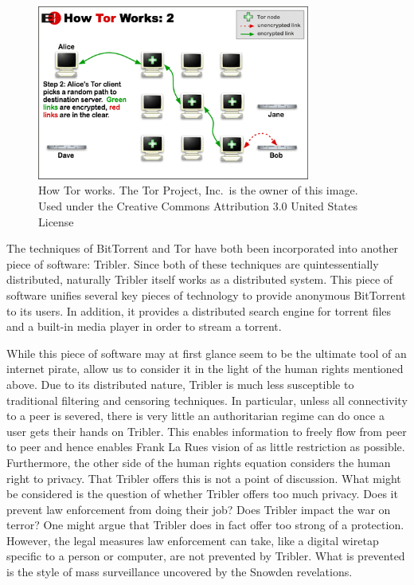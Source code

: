 \documentclass[a4paper,11pt]{book}
\theoremstyle{definition}
\begin{document}
\begin{figure}[ht]
    \centering
    \includegraphics[width=0.8\textwidth]{plots_all/htw2}
    \caption{How Tor works. The Tor Project, Inc.\protect\footnotemark~is the owner of this image. 
    Used under the Creative Commons Attribution 3.0 United States License\protect\footnotemark }
    \label{fig:htw2}

\end{figure}

The techniques of BitTorrent and Tor have both been incorporated into another piece
of software: Tribler. Since both of these techniques are quintessentially distributed,
naturally Tribler itself works as a distributed system. This piece of software unifies
several key pieces of technology to provide anonymous BitTorrent to its users. In addition,
it provides a distributed search engine for torrent files and a built-in media player in
order to stream a torrent. 

While this piece of software may at first glance seem to be the ultimate tool of an internet pirate, 
allow us to consider it in the light of the human rights mentioned above. Due to its
distributed nature, Tribler is much less susceptible to traditional filtering and
censoring techniques. In particular, unless all connectivity to a peer is severed,
there is very little an authoritarian regime can do once a user gets their hands
on Tribler. This enables information to freely flow from peer to peer and hence 
enables Frank La Rues vision of as little restriction as possible. 
Furthermore, the other side of the human rights equation considers the human
right to privacy. That Tribler offers this is not a point of discussion. What might
be considered is the question of whether Tribler offers too much privacy. Does it
prevent law enforcement from doing their job? Does Tribler impact the war on terror?
One might argue that Tribler does in fact offer too strong of a protection.
However, the legal measures law enforcement can take, like a digital
wiretap specific to a person or computer, are not prevented by Tribler. What is
prevented is the style of mass surveillance uncovered by the Snowden revelations. 
\end{document}
